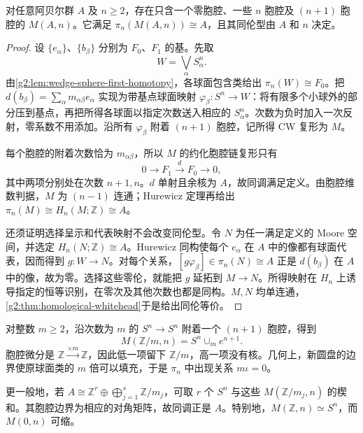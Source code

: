 \begin{proposition}\label{g2:prop:moore-existence}
	对任意阿贝尔群 \(A\) 及 \(n\ge2\)，存在只含一个零胞腔、一些 \(n\) 胞腔及 \((n+1)\) 胞腔的 \(M(A,n)\)。它满足 \(\pi_n(M(A,n))\cong A\)，且其同伦型由 \(A\) 和 \(n\) 决定。
\end{proposition}
\begin{proof}
	设 \(\{e_\alpha\}\)、\(\{b_\beta\}\) 分别为 \(F_0\)、\(F_1\) 的基。先取
	\[
		W=\bigvee_\alpha S^n_\alpha.
	\]
	由\cref{g2:lem:wedge-sphere-first-homotopy}，各球面包含类给出 \(\pi_n(W)\cong F_0\)。把 \(d(b_\beta)=\sum_\alpha m_{\alpha\beta}e_\alpha\) 实现为带基点球面映射 \(\varphi_\beta:S^n\to W\)：将有限多个小球外的部分压到基点，再把所得各球面以指定次数送入相应的 \(S^n_\alpha\)。次数为负时加入一次反射，零系数不用添加。沿所有 \(\varphi_\beta\) 附着 \((n+1)\) 胞腔，记所得 CW 复形为 \(M\)。

	每个胞腔的附着次数恰为 \(m_{\alpha\beta}\)，所以 \(M\) 的约化胞腔链复形只有
	\[
		0\longrightarrow F_1\xrightarrow{d}F_0\longrightarrow0,
	\]
	其中两项分别处在次数 \(n+1,n\)。\(d\) 单射且余核为 \(A\)，故同调满足定义。由胞腔维数判据，\(M\) 为 \((n-1)\) 连通；Hurewicz 定理再给出 \(\pi_n(M)\cong H_n(M;\mathbb Z)\cong A\)。

	还须证明选择呈示和代表映射不会改变同伦型。令 \(N\) 为任一满足定义的 Moore 空间，并选定 \(H_n(N;\mathbb Z)\cong A\)。Hurewicz 同构使每个 \(e_\alpha\) 在 \(A\) 中的像都有球面代表，因而得到 \(g:W\to N\)。对每个关系，\([g\varphi_\beta]\in\pi_n(N)\cong A\) 正是 \(d(b_\beta)\) 在 \(A\) 中的像，故为零。选择这些零伦，就能把 \(g\) 延拓到 \(M\to N\)。所得映射在 \(H_n\) 上诱导指定的恒等识别，在零次及其他次数也都是同构。\(M,N\) 均单连通，\cref{g2:thm:homological-whitehead}于是给出同伦等价。
\end{proof}

\begin{example}\label{g2:exm:cyclic-moore-space}
	对整数 \(m\ge2\)，沿次数为 \(m\) 的 \(S^n\to S^n\) 附着一个 \((n+1)\) 胞腔，得到
	\[
		M(\mathbb Z/m,n)=S^n\cup_m e^{n+1}.
	\]
	胞腔微分是 \(\mathbb Z\xrightarrow{\times m}\mathbb Z\)，因此低一项留下 \(\mathbb Z/m\)，高一项没有核。几何上，新圆盘的边界使原球面类的 \(m\) 倍可以填充，于是 \(\pi_n\) 中出现关系 \(m\iota=0\)。

	更一般地，若 \(A\cong\mathbb Z^r\oplus\bigoplus_{j=1}^s\mathbb Z/m_j\)，可取 \(r\) 个 \(S^n\) 与这些 \(M(\mathbb Z/m_j,n)\) 的楔和。其胞腔边界为相应的对角矩阵，故同调正是 \(A\)。特别地，\(M(\mathbb Z,n)\simeq S^n\)，而 \(M(0,n)\) 可缩。
\end{example}

